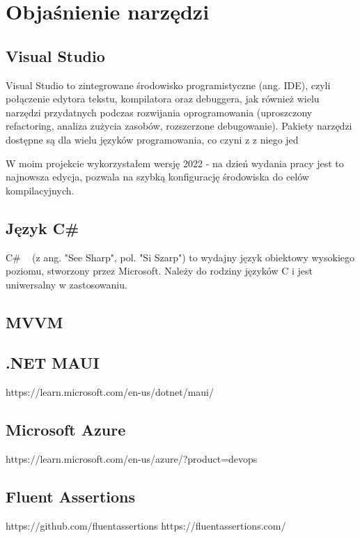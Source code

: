 \section{Objaśnienie narzędzi}

\subsection{Visual Studio}

Visual Studio to zintegrowane środowisko programistyczne (ang. IDE), czyli połączenie edytora tekstu,
kompilatora oraz debuggera, jak również wielu narzędzi przydatnych podczas rozwijania oprogramowania
(uproszczony refactoring, analiza zużycia zasobów, rozszerzone debugowanie). Pakiety narzędzi dostępne są dla wielu
języków programowania, co czyni z z niego jed

W moim projekcie wykorzystałem wersję 2022 - na dzień wydania pracy jest to najnowsza edycja,
pozwala na szybką konfigurację środowiska do celów kompilacyjnych.

\subsection{Język C\#}

C\# ~\cite{csharpDocs} (z ang. "See Sharp", pol. "Si Szarp") to wydajny język obiektowy wysokiego poziomu, stworzony przez Microsoft.
Należy do rodziny języków C i jest uniwersalny w zastosowaniu.

\subsection{MVVM}

\subsection{.NET MAUI}
https://learn.microsoft.com/en-us/dotnet/maui/

\subsection{Microsoft Azure}
https://learn.microsoft.com/en-us/azure/?product=devops

\subsection{Fluent Assertions}
https://github.com/fluentassertions
https://fluentassertions.com/


